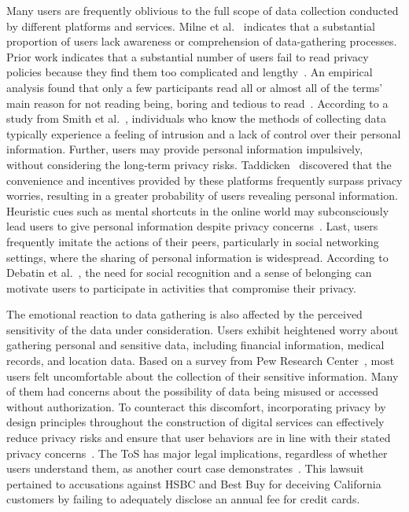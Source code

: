 
Many users are frequently oblivious to the full scope of data collection conducted by different platforms and services.
Milne et al.~\cite{milne2004consumers} indicates that a substantial proportion of users lack awareness or comprehension of data-gathering processes.
Prior work indicates that a substantial number of users fail to read privacy policies because they find them too complicated and lengthy~\cite{acquisti2015privacy}.
An empirical analysis found that only a few participants read all or almost all of the terms' main reason for not reading being, boring and tedious to read~\cite{maronick2014consumers}.
According to a study from Smith et al.~\cite{smith1996information}, individuals who know the methods of collecting data typically experience a feeling of intrusion and a lack of control over their personal information.
Further, users may provide personal information impulsively, without considering the long-term privacy risks.
Taddicken~\cite{taddicken2014privacy} discovered that the convenience and incentives provided by these platforms frequently surpass privacy worries, resulting in a greater probability of users revealing personal information.
Heuristic cues such as mental shortcuts in the online world may subconsciously lead users to give personal information despite privacy concerns~\cite{sundar2013unlocking}.
Last, users frequently imitate the actions of their peers, particularly in social networking settings, where the sharing of personal information is widespread.
According to Debatin et al.~\cite{debatin2009facebook}, the need for social recognition and a sense of belonging can motivate users to participate in activities that compromise their privacy.


The emotional reaction to data gathering is also affected by the perceived sensitivity of the data under consideration.
Users exhibit heightened worry about gathering personal and sensitive data, including financial information, medical records, and location data.
Based on a survey from Pew Research Center~\cite{pew2019privacy}, most users felt uncomfortable about the collection of their sensitive information.
Many of them had concerns about the possibility of data being misused or accessed without authorization.
To counteract this discomfort, incorporating privacy by design principles throughout the construction of digital services can effectively reduce privacy risks and ensure that user behaviors are in line with their stated privacy concerns~\cite{cavoukian2009privacy}.
The ToS has major legal implications, regardless of whether users understand them, as another court case demonstrates~\cite{2012davis}.
This lawsuit pertained to accusations against HSBC and Best Buy for deceiving California customers by failing to adequately disclose an annual fee for credit cards.


